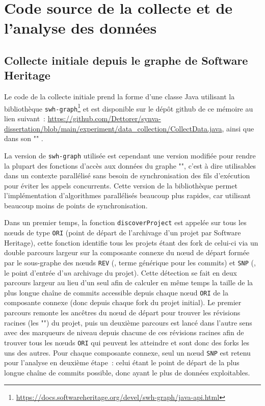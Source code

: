 
\chapter{Code source de la collecte et de l'analyse des données}

\section{Collecte initiale depuis le graphe de Software Heritage}
\label{app:collect.java}

Le code de la collecte initiale prend la forme d'une classe Java utilisant la bibliothèque
\texttt{swh-graph}\footnote{\url{https://docs.softwareheritage.org/devel/swh-graph/java-api.html}} et est
disponible sur le dépôt \gls{github} de ce mémoire au lien suivant :
\url{https://github.com/Dettorer/synva-dissertation/blob/main/experiment/data_collection/CollectData.java},
ainsi que dans son "" \parencite{replication-package}.

La version de \texttt{swh-graph} utilisée est cependant une version modifiée pour rendre la plupart des
fonctions d'accès aux données du graphe "", c'est à dire utilisables dans un contexte
parallélisé sans besoin de synchronisation des fils d'exécution pour éviter les appels concurrents. Cette
version de la bibliothèque permet l'implémentation d'algorithmes parallélisés beaucoup plus rapides, car
utilisant beaucoup moins de points de synchronisation.

Dans un premier temps, la fonction \texttt{discoverProject} est appelée sur tous les nœuds de type
\texttt{ORI} (point de départ de l'archivage d'un projet par Software Heritage), cette fonction identifie tous
les projets étant des \gls{fork} de celui-ci via un double parcours largeur sur la composante connexe du nœud
de départ formée par le sous-graphe des nœuds \texttt{REV} (, terme générique pour les
\glspl{commit}) et \texttt{SNP} (, le point d'entrée d'\emph{un} archivage du projet). Cette
détection se fait en deux parcours largeur au lieu d'un seul afin de calculer en même temps la taille de la
plus longue chaîne de commits accessible depuis chaque nœud \texttt{ORI} de la composante connexe (donc depuis
chaque \gls{fork} du projet initial). Le premier parcours remonte les ancêtres du nœud de départ pour trouver
les révisions racines (les "") du projet, puis un deuxième parcours est lancé dans
l'autre sens avec des marqueurs de niveau depuis chacune de ces révisions racines afin de trouver tous les
nœuds \texttt{ORI} qui peuvent les atteindre et sont donc des \glspl{fork} les uns des autres. Pour chaque
composante connexe, seul un nœud \texttt{SNP} est retenu pour l'analyse en deuxième étape : celui étant le
point de départ de la plus longue chaîne de \glspl{commit} possible, donc ayant le plus de données
exploitables.

